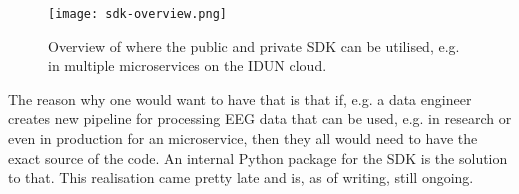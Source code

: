 \begin{figure}[!ht]
  \centering
  \texttt{[image: sdk-overview.png]}
  \caption{Overview of where the public and private SDK can be utilised, e.g. in multiple microservices on the IDUN cloud.}
  \label{fig:sdk-overview}
\end{figure}

The reason why one would want to have that is that if, e.g. a data engineer creates new pipeline for processing EEG data that can be used, e.g. in research or even in production for an microservice, then they all would need to have the exact source of the code. An internal Python package for the SDK is the solution to that. This realisation came pretty late and is, as of writing, still ongoing.
